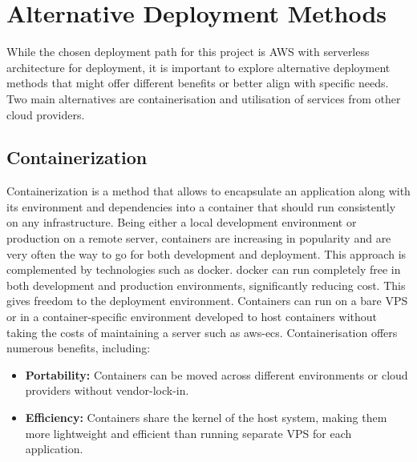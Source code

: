 \section{Alternative Deployment Methods}
\label{sec:alternative-deployment-methods}

While the chosen deployment path for this project is \ac{AWS} with serverless architecture for deployment, it is important to explore alternative deployment methods that might offer different benefits or better align with specific needs.
Two main alternatives are containerisation and utilisation of services from other cloud providers.


\subsection{Containerization}
\label{subsec:containerization}
Containerization is a method that allows to encapsulate an application along with its environment and dependencies into a container that should run consistently on any infrastructure. 
Being either a local development environment or production on a remote server, containers are increasing in popularity and are very often the way to go for both development and deployment.
This approach is complemented by technologies such as \gls{docker}.
\gls{docker} can run completely free in both development and production environments, significantly reducing cost.
This gives freedom to the deployment environment. 
Containers can run on a bare \ac{VPS} or in a container-specific environment developed to host containers without taking the costs of maintaining a server such as \gls{aws-ecs}.
 Containerisation offers numerous benefits, including:
 \begin{itemize}
     \item \textbf{Portability:} Containers can be moved across different environments or cloud providers without vendor-lock-in.
     \item \textbf{Efficiency:} Containers share the kernel of the host system, making them more lightweight and efficient than running separate \ac{VPS} for each application.
 \end{itemize}


